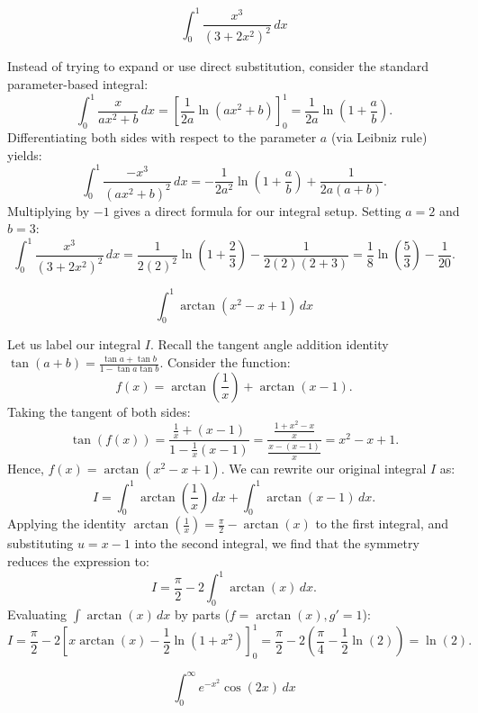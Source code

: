 \begin{questions}
    \question
    \[ \int_{0}^{1} \frac{x^{3}}{(3+2x^{2})^{2}} \, dx \]

    \begin{solution}
    Instead of trying to expand or use direct substitution, consider the standard parameter-based integral:
    \[ \int_{0}^{1} \frac{x}{ax^{2}+b} \, dx = \left[ \frac{1}{2a} \ln(ax^2+b) \right]_0^1 = \frac{1}{2a}\ln\left(1+\frac{a}{b}\right). \]
    Differentiating both sides with respect to the parameter $a$ (via Leibniz rule) yields:
    \[ \int_{0}^{1} \frac{-x^{3}}{(ax^{2}+b)^{2}} \, dx = -\frac{1}{2a^{2}}\ln\left(1+\frac{a}{b}\right) + \frac{1}{2a(a+b)}. \]
    Multiplying by $-1$ gives a direct formula for our integral setup. Setting $a=2$ and $b=3$:
    \[ \int_{0}^{1} \frac{x^{3}}{(3+2x^{2})^{2}} \, dx = \frac{1}{2(2)^2}\ln\left(1+\frac{2}{3}\right) - \frac{1}{2(2)(2+3)} = \frac{1}{8}\ln\left(\frac{5}{3}\right) - \frac{1}{20}. \]
    \end{solution}

    \question
    \[ \int_{0}^{1} \arctan(x^{2}-x+1) \, dx \]

    \begin{solution}
    Let us label our integral $I$. Recall the tangent angle addition identity $\tan(a+b)=\frac{\tan a + \tan b}{1-\tan a \tan b}$. Consider the function:
    \[ f(x) = \arctan\left(\frac{1}{x}\right) + \arctan(x-1). \]
    Taking the tangent of both sides:
    \[ \tan(f(x)) = \frac{\frac{1}{x} + (x-1)}{1 - \frac{1}{x}(x-1)} = \frac{\frac{1+x^2-x}{x}}{\frac{x-(x-1)}{x}} = x^2-x+1. \]
    Hence, $f(x) = \arctan(x^2-x+1)$. We can rewrite our original integral $I$ as:
    \[ I = \int_{0}^{1} \arctan\left(\frac{1}{x}\right) \, dx + \int_{0}^{1} \arctan(x-1) \, dx. \]
    Applying the identity $\arctan(\frac{1}{x}) = \frac{\pi}{2} - \arctan(x)$ to the first integral, and substituting $u=x-1$ into the second integral, we find that the symmetry reduces the expression to:
    \[ I = \frac{\pi}{2} - 2\int_{0}^{1} \arctan(x) \, dx. \]
    Evaluating $\int \arctan(x) \, dx$ by parts ($f=\arctan(x), g'=1$):
    \[ I = \frac{\pi}{2} - 2\left[x \arctan(x) - \frac{1}{2}\ln(1+x^{2})\right]_{0}^{1} = \frac{\pi}{2} - 2\left(\frac{\pi}{4} - \frac{1}{2}\ln(2)\right) = \ln(2). \]
    \end{solution}

    \question
    \[ \int_{0}^{\infty} e^{-x^{2}}\cos(2x) \, dx \]


\end{questions}

